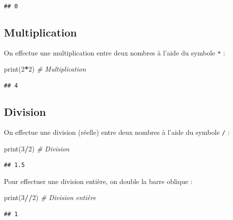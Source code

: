 \documentclass[12pt,]{book}
\newenvironment{Shaded}{\begin{snugshade}}{\end{snugshade}}
\newcommand{\DecValTok}[1]{\textcolor[rgb]{0.00,0.00,0.81}{#1}}
\newcommand{\CommentTok}[1]{\textcolor[rgb]{0.56,0.35,0.01}{\textit{#1}}}
\newcommand{\OperatorTok}[1]{\textcolor[rgb]{0.81,0.36,0.00}{\textbf{#1}}}
\newcommand{\BuiltInTok}[1]{#1}
\newcommand{\NormalTok}[1]{#1}
\numberwithin{equation}{section}
\numberwithin{countremarque}{section}
\begin{document}
\begin{lstlisting}
## 0
\end{lstlisting}

\subsection{Multiplication}\label{multiplication}

On effectue une multiplication entre deux nombres à l'aide du symbole
\texttt{*} :

\begin{Shaded}
\begin{Highlighting}[]
\BuiltInTok{print}\NormalTok{(}\DecValTok{2}\OperatorTok{*}\DecValTok{2}\NormalTok{) }\CommentTok{# Multiplication}
\end{Highlighting}
\end{Shaded}

\begin{lstlisting}
## 4
\end{lstlisting}

\subsection{Division}\label{division}

On effectue une division (réelle) entre deux nombres à l'aide du symbole
\texttt{/} :

\begin{Shaded}
\begin{Highlighting}[]
\BuiltInTok{print}\NormalTok{(}\DecValTok{3}\OperatorTok{/}\DecValTok{2}\NormalTok{) }\CommentTok{# Division}
\end{Highlighting}
\end{Shaded}

\begin{lstlisting}
## 1.5
\end{lstlisting}

Pour effectuer une division entière, on double la barre oblique :

\begin{Shaded}
\begin{Highlighting}[]
\BuiltInTok{print}\NormalTok{(}\DecValTok{3}\OperatorTok{//}\DecValTok{2}\NormalTok{) }\CommentTok{# Division entière}
\end{Highlighting}
\end{Shaded}

\begin{lstlisting}
## 1
\end{lstlisting}
\end{document}
